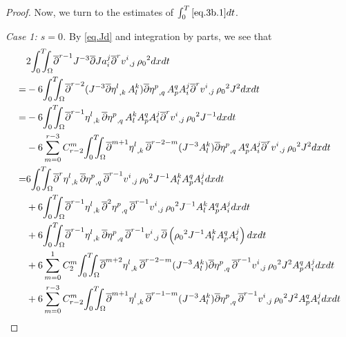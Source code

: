 \documentclass[12pt,twoside,reqno]{amsart}
\numberwithin{equation}{section}
\theoremstyle{definition}
\theoremstyle{remark}
\begin{document}
\begin{proof}
Now, we turn to the estimates of $\int_0^T\eqref{eq.3b.1}dt$.

\emph{Case 1: $s=0$.} By \eqref{eq.Jd} and integration by parts, we see that
\begin{align}
  &2 {\int_0^T\!\!\!\!\int_\Omega } {\overline{\partial}}^{r-1} J^{-3}{\overline{\partial}}  J a^j_i{{{{\overline{\partial}}^r v^i}}_{,{j}}\,}{\rho_0}^2 dxdt\label{eq.3b.2}\\
  =&-6{\int_0^T\!\!\!\!\int_\Omega } {\overline{\partial}}^{r-2}( J^{-3}{{{{\overline{\partial}}\eta^l}}_{,{k}}\,}A^k_l)  {{{{\overline{\partial}}\eta^p}}_{,{q}}\,}A^q_p  A^j_i{{{{\overline{\partial}}^r v^i}}_{,{j}}\,}{\rho_0}^2 J^2 dxdt{\nonumber}\\
  =&-6{\int_0^T\!\!\!\!\int_\Omega } {{{{\overline{\partial}}^{r-1}\eta^l}}_{,{k}}\,} {{{{\overline{\partial}}\eta^p}}_{,{q}}\,}A^k_l A^q_p  A^j_i{{{{\overline{\partial}}^r v^i}}_{,{j}}\,}{\rho_0}^2 J^{-1} dxdt{\nonumber}\\
  &-6\sum_{m=0}^{r-3} C_{r-2}^m{\int_0^T\!\!\!\!\int_\Omega } {{{{\overline{\partial}}^{m+1}\eta^l}}_{,{k}}\,}{\overline{\partial}}^{r-2-m}( J^{-3}A^k_l)  {{{{\overline{\partial}}\eta^p}}_{,{q}}\,}A^q_p  A^j_i{{{{\overline{\partial}}^r v^i}}_{,{j}}\,}{\rho_0}^2 J^2 dxdt{\nonumber}\\
  =&6{\int_0^T\!\!\!\!\int_\Omega } {{{{\overline{\partial}}^r\eta^l}}_{,{k}}\,} {{{{\overline{\partial}}\eta^p}}_{,{q}}\,}{{{{\overline{\partial}}^{r-1} v^i}}_{,{j}}\,}{\rho_0}^2 J^{-1}A^k_l A^q_p  A^j_i dxdt\label{eq.3b.3}\\
  &+6{\int_0^T\!\!\!\!\int_\Omega } {{{{\overline{\partial}}^{r-1}\eta^l}}_{,{k}}\,} {{{{\overline{\partial}}^2\eta^p}}_{,{q}}\,}{{{{\overline{\partial}}^{r-1} v^i}}_{,{j}}\,}{\rho_0}^2 J^{-1}A^k_l A^q_p  A^j_i dxdt\label{eq.3b.4}\\
  &+6{\int_0^T\!\!\!\!\int_\Omega } {{{{\overline{\partial}}^{r-1}\eta^l}}_{,{k}}\,} {{{{\overline{\partial}}\eta^p}}_{,{q}}\,}{{{{\overline{\partial}}^{r-1} v^i}}_{,{j}}\,}{\overline{\partial}}\left({\rho_0}^2 J^{-1}A^k_l A^q_p  A^j_i\right) dxdt\label{eq.3b.5}\\
  &+6\sum_{m=0}^1 C_2^m{\int_0^T\!\!\!\!\int_\Omega } {{{{\overline{\partial}}^{m+2}\eta^l}}_{,{k}}\,}{\overline{\partial}}^{r-2-m}( J^{-3}A^k_l)  {{{{\overline{\partial}}\eta^p}}_{,{q}}\,}{{{{\overline{\partial}}^{r-1} v^i}}_{,{j}}\,}{\rho_0}^2 J^2 A^q_p  A^j_i dxdt\label{eq.3b.6}\\
  &+6\sum_{m=0}^{r-3} C_{r-2}^m{\int_0^T\!\!\!\!\int_\Omega } {{{{\overline{\partial}}^{m+1}\eta^l}}_{,{k}}\,}{\overline{\partial}}^{r-1-m}( J^{-3}A^k_l)  {{{{\overline{\partial}}\eta^p}}_{,{q}}\,}{{{{\overline{\partial}}^{r-1} v^i}}_{,{j}}\,}{\rho_0}^2 J^2 A^q_p  A^j_i dxdt\label{eq.3b.7}\\

\end{align}
\end{proof}
\end{document}
